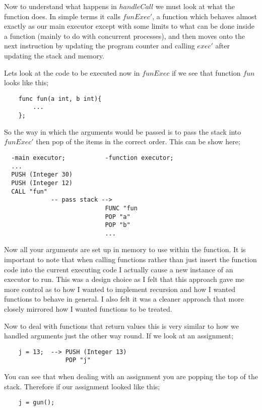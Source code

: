 Now to understand what happens in $handleCall$ we must look at what the function does. In simple terms it calls $funExec'$, a function which behaves almost exactly as our main executor except with some limits to what can be done inside a function (mainly to do with concurrent processes), and then moves onto the next instruction by updating the program counter and calling $exec'$ after updating the stack and memory. 

Lets look at the code to be executed now in $funExec$ if we see that function $fun$ looks like this;

\begin{lstlisting}
	func fun(a int, b int){
		...
	};
\end{lstlisting}

So the way in which the arguments would be passed is to pass the stack into $funExec'$ then pop of the items in the correct order. This can be show here;

\begin{lstlisting}
  -main executor;           -function executor;
  ...
  PUSH (Integer 30)
  PUSH (Integer 12)
  CALL "fun"
             -- pass stack --> 
                            FUNC "fun  
                            POP "a"
                            POP "b"
                            ...
\end{lstlisting}
  
Now all your arguments are set up in memory to use within the function. It is important to note that when calling functions rather than just insert the function code into the current executing code I actually cause a new instance of an executor to run. This was a design choice as I felt that this approach gave me more control as to how I wanted to implement recursion and how I wanted functions to behave in general. I also felt it was a cleaner approach that more closely mirrored how I wanted functions to be treated.

Now to deal with functions that return values this is very similar to how we handled arguments just the other way round. If we look at an assignment;

\begin{lstlisting}
	j = 13;  --> PUSH (Integer 13)
	             POP "j"	
\end{lstlisting}

You can see that when dealing with an assignment you are popping the top of the stack. Therefore if our assignment looked like this;

\begin{lstlisting}
	j = gun();
\end{lstlisting} 

